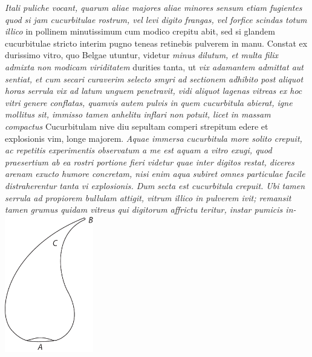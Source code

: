 \textit{Itali puliche\protect{} vocant, quarum aliae majores aliae minores sensum etiam fugientes quod si jam cucurbitulae rostrum, vel levi digito frangas, vel forfice scindas totum illico } in pollinem minutissimum cum modico crepitu abit, sed si glandem cucurbitulae stricto interim pugno teneas retinebis pulverem in manu. Constat ex durissimo vitro, quo Belgae 
utuntur, videtur
\textit{minus dilutum, et multa filix admixta non modicam viriditatem } durities tanta, ut \textit{vix adamantem admittat aut sentiat, et cum secari curaverim selecto smyri ad sectionem adhibito post aliquot horas serrula vix ad latum unguem penetravit, vidi aliquot lagenas vitreas\protect{} ex hoc vitri genere conflatas, quamvis autem pulvis in quem cucurbitula abierat, igne mollitus sit, immisso tamen anhelitu inflari non potuit, licet in massam compactus } 
\pend
\pstart
Cucurbitulam nive diu sepultam comperi strepitum edere et explosionis vim, longe majorem. \textit{Aquae immersa cucurbitula\protect{} more solito crepuit, ac repetitis experimentis observatum a me est aquam a vitro exugi, quod praesertium ab ea rostri portione fieri videtur quae inter digitos restat, diceres arenam exucto humore concretam, nisi enim aqua subiret omnes particulae facile distraherentur tanta vi explosionis\protect{}. Dum secta est cucurbitula crepuit.
Ubi tamen serrula ad propiorem bullulam attigit,
vitrum illico in pulverem ivit;
remansit tamen grumus quidam vitreus qui digitorum affrictu teritur,
instar pumicis in-}
\pend
\vspace{1.2em}
\pstart
\centering
\includegraphics[trim = 0mm 0mm 0mm 0mm, clip, width=0.29\textwidth]{images//LH035,14,02_148r-d.pdf}\\
